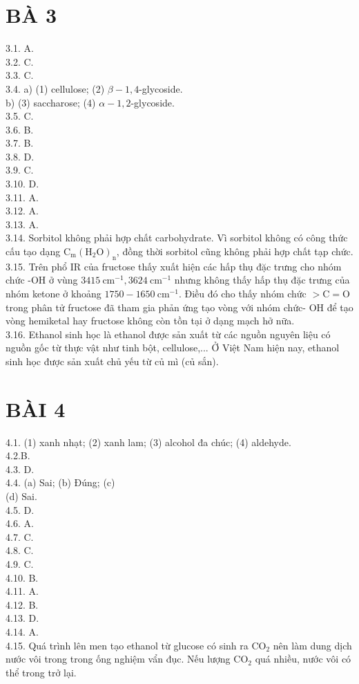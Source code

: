 \documentclass[10pt]{article}
\begin{document}
\section*{BÀ 3}
3.1. A.\\
3.2. C.\\
3.3. C.\\
3.4. a) (1) cellulose; (2) $\beta-1,4$-glycoside.\\
b) (3) saccharose; (4) $\alpha-1,2$-glycoside.\\
3.5. C.\\
3.6. B.\\
3.7. B.\\
3.8. D.\\
3.9. C.\\
3.10. D.\\
3.11. A.\\
3.12. A.\\
3.13. A.\\
3.14. Sorbitol không phải hợp chất carbohydrate. Vì sorbitol không có công thức cấu tạo dạng $\mathrm{C}_{\mathrm{m}}\left(\mathrm{H}_{2} \mathrm{O}\right)_{\mathrm{n}}$, đồng thời sorbitol cũng không phải hợp chất tạp chức.\\
3.15. Trên phổ IR của fructose thấy xuất hiện các hấp thụ đặc trưng cho nhóm chức -OH ở vùng $3415 \mathrm{~cm}^{-1}, 3624 \mathrm{~cm}^{-1}$ nhưng không thấy hấp thụ đặc trưng của nhóm ketone ở khoảng $1750-1650 \mathrm{~cm}^{-1}$. Điều đó cho thấy nhóm chức $>\mathrm{C}=\mathrm{O}$ trong phân tử fructose đã tham gia phản ứng tạo vòng với nhóm chức- OH để tạo vòng hemiketal hay fructose không còn tồn tại ở dạng mạch hở nữa.\\
3.16. Ethanol sinh học là ethanol được sản xuất từ các nguồn nguyên liệu có nguồn gốc từ thực vật như tinh bột, cellulose,... Ở Việt Nam hiện nay, ethanol sinh học được sản xuất chủ yếu từ củ mì (củ sắn).

\section*{BÀI 4}
4.1. (1) xanh nhạt; (2) xanh lam; (3) alcohol đa chúc; (4) aldehyde.\\
4.2.B.\\
4.3. D.\\
4.4. (a) Sai; (b) Đúng; (c)\\
(d) Sai.\\
4.5. D.\\
4.6. A.\\
4.7. C.\\
4.8. C.\\
4.9. C.\\
4.10. B.\\
4.11. A.\\
4.12. B.\\
4.13. D.\\
4.14. A.\\
4.15. Quá trình lên men tạo ethanol từ glucose có sinh ra $\mathrm{CO}_{2}$ nên làm dung dịch nước vôi trong trong ống nghiệm vẩn đục. Nếu lượng $\mathrm{CO}_{2}$ quá nhiều, nước vôi có thể trong trở lại.
\end{document}

